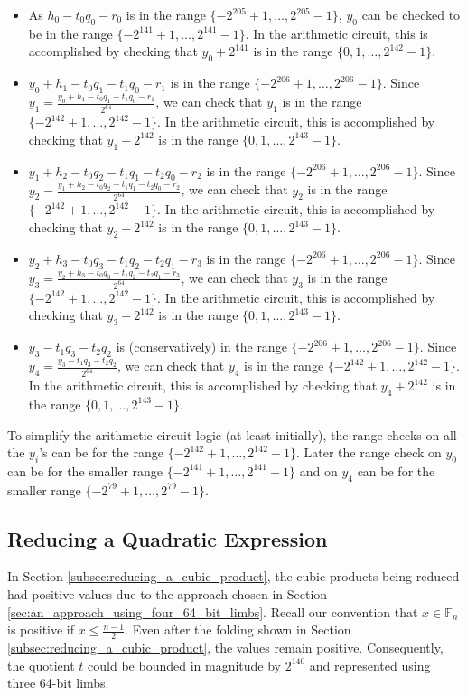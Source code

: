 \documentclass[a4paper, 12pt]{article}
\begin{document}
\begin{itemize}
  \item As $h_0 - t_0q_0-r_0$ is in the range $\{-2^{205}+1,\ldots, 2^{205}-1\}$, $y_0$ can be checked to be in the range $\{-2^{141}+1,\ldots, 2^{141}-1\}$. In the arithmetic circuit, this is accomplished by checking that $y_0 + 2^{141}$ is in the range $\{0,1,\ldots,2^{142}-1\}$.
  \item $y_0+h_1-t_0q_1-t_1q_0-r_1$ is in the range $\{-2^{206}+1,\ldots, 2^{206}-1\}$. Since $y_1 = \frac{y_0+h_1-t_0q_1-t_1q_0-r_1}{2^{64}}$, we can check that $y_1$ is in the range $\{-2^{142}+1,\ldots, 2^{142}-1\}$. In the arithmetic circuit, this is accomplished by checking that $y_1 + 2^{142}$ is in the range $\{0,1,\ldots,2^{143}-1\}$.
  \item $y_1+h_2-t_0q_2-t_1q_1-t_2q_0-r_2$ is in the range $\{-2^{206}+1,\ldots, 2^{206}-1\}$. Since $y_2 = \frac{y_1+h_2-t_0q_2-t_1q_1-t_2q_0-r_2}{2^{64}}$, we can check that $y_2$ is in the range $\{-2^{142}+1,\ldots, 2^{142}-1\}$. In the arithmetic circuit, this is accomplished by checking that $y_2 + 2^{142}$ is in the range $\{0,1,\ldots,2^{143}-1\}$.
  \item $y_2+h_3-t_0q_3-t_1q_2-t_2q_1-r_3$ is in the range $\{-2^{206}+1,\ldots, 2^{206}-1\}$. Since $y_3 = \frac{y_2+h_3-t_0q_3-t_1q_2-t_2q_1-r_3}{2^{64}}$, we can check that $y_3$ is in the range $\{-2^{142}+1,\ldots, 2^{142}-1\}$. In the arithmetic circuit, this is accomplished by checking that $y_3 + 2^{142}$ is in the range $\{0,1,\ldots,2^{143}-1\}$.
  \item $y_3-t_1q_3-t_2q_2$ is (conservatively) in the range $\{-2^{206}+1,\ldots, 2^{206}-1\}$. Since $y_4 = \frac{y_3-t_1q_3-t_2q_2}{2^{64}}$, we can check that $y_4$ is in the range $\{-2^{142}+1,\ldots, 2^{142}-1\}$. In the arithmetic circuit, this is accomplished by checking that $y_4 + 2^{142}$ is in the range $\{0,1,\ldots,2^{143}-1\}$.
\end{itemize}
To simplify the arithmetic circuit logic (at least initially), the range checks on all the $y_i$'s can be for the range $\{-2^{142}+1,\ldots, 2^{142}-1\}$. Later the range check on $y_0$ can be for the smaller range $\{-2^{141}+1,\ldots,2^{141}-1\}$ and on $y_4$ can be for the smaller range $\{-2^{79}+1,\ldots,2^{79}-1\}$.

\subsection{Reducing a Quadratic Expression}%
\label{subsec:reducing_a_quadratic_expression}
In Section \ref{subsec:reducing_a_cubic_product}, the cubic products being reduced had positive values due to the approach chosen in Section \ref{sec:an_approach_using_four_64_bit_limbs}. Recall our convention that $x \in \mathbb{F}_n$ is positive if $x \le \frac{n-1}{2}$. Even after the folding shown in Section \ref{subsec:reducing_a_cubic_product}, the values remain positive. Consequently, the quotient $t$ could be bounded in magnitude by $2^{140}$ and represented using three 64-bit limbs.
\end{document}
